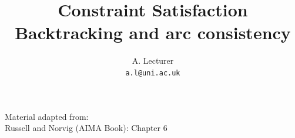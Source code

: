 \documentclass{beamer}
\author[A. Lecturer]{A. Lecturer\\ \texttt{a.l@uni.ac.uk}}
\institute[Somewhere]{University of Somewhere}
\title[CSP]{Constraint Satisfaction\\\large{Backtracking and arc consistency}}
\date{}
\begin{document}
\begin{frame}
	\maketitle
	\vspace{-4em}
	\begin{center}
		Material adapted from: \\
		Russell and Norvig (AIMA Book): Chapter 6
	\end{center}
\end{frame}
\end{document}
